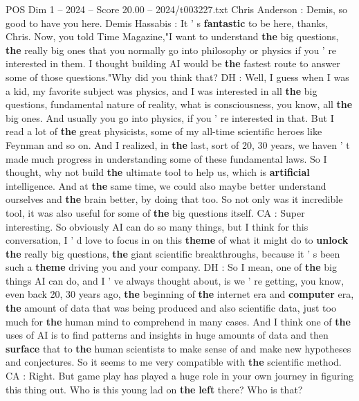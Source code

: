 \begin{textsample}{POS Dim 1 – 2024 – Score 20.00 – 2024/t003227.txt}  \label{ex:f1_pos_048}
Chris Anderson : Demis, so good to have you here.
Demis Hassabis : It ' s \textbf{fantastic} to be here, thanks, Chris.
Now, you told Time Magazine,"I want to understand \textbf{the} big questions, \textbf{the} really big ones that you normally go into philosophy or physics if you ' re interested in them.
I thought building AI would be \textbf{the} fastest route to answer some of those questions."Why did you think that?
DH : Well, I guess when I was a kid, my favorite subject was physics, and I was interested in all \textbf{the} big questions, fundamental nature of reality, what is consciousness, you know, all \textbf{the} big ones.
And usually you go into physics, if you ' re interested in that.
But I read a lot of \textbf{the} great physicists, some of my all-time scientific heroes like Feynman and so on.
And I realized, in \textbf{the} last, sort of 20, 30 years, we haven ' t made much progress in understanding some of these fundamental laws.
So I thought, why not build \textbf{the} ultimate tool to help us, which is \textbf{artificial} intelligence.
And at \textbf{the} same time, we could also maybe better understand ourselves and \textbf{the} brain better, by doing that too.
So not only was it incredible tool, it was also useful for some of \textbf{the} big questions itself.
CA : Super interesting.
So obviously AI can do so many things, but I think for this conversation, I ' d love to focus in on this \textbf{theme} of what it might do to \textbf{unlock} \textbf{the} really big questions, \textbf{the} giant scientific breakthroughs, because it ' s been such a \textbf{theme} driving you and your company.
DH : So I mean, one of \textbf{the} big things AI can do, and I ' ve always thought about, is we ' re getting, you know, even back 20, 30 years ago, \textbf{the} beginning of \textbf{the} internet era and \textbf{computer} era, \textbf{the} amount of data that was being produced and also scientific data, just too much for \textbf{the} human mind to comprehend in many cases.
And I think one of \textbf{the} uses of AI is to find patterns and insights in huge amounts of data and then \textbf{surface} that to \textbf{the} human scientists to make sense of and make new hypotheses and conjectures.
So it seems to me very compatible with \textbf{the} scientific method.
CA : Right.
But game play has played a huge role in your own journey in figuring this thing out.
Who is this young lad on \textbf{the} \textbf{left} there?
Who is that?

\end{textsample}
